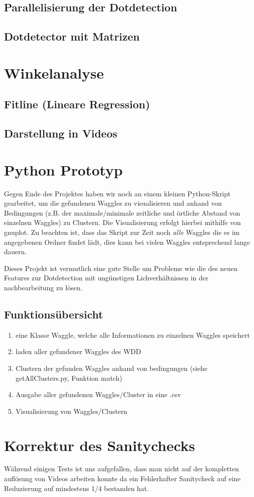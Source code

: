 \documentclass[11pt,a4paper]{article}
\begin{document}
\subsection{Parallelisierung der Dotdetection}%
\subsection{Dotdetector mit Matrizen}%

\section{Winkelanalyse}%

\subsection{Fitline (Lineare Regression)}%
\subsection{Darstellung in Videos}%


\section{Python Prototyp}%
Gegen Ende des Projektes haben wir noch an einem kleinen Python-Skript gearbeitet, um die gefundenen Waggles zu visualisieren und anhand von Bedingungen (z.B. der maximale/minimale zeitliche und örtliche Abstand von einzelnen Waggles) zu Clustern. Die Visualisierung erfolgt hierbei mithilfe von gnuplot. Zu beachten ist, dass das Skript zur Zeit noch \emph{alle} Waggles die es im angegebenen Ordner findet lädt, dies kann bei vielen Waggles entsprechend lange dauern.

Dieses Projekt ist vermutlich eine gute Stelle um Probleme wie die des neuen Features zur Dotdetection mit ungünstigen Lichverhältnissen in der nachbearbeitung zu lösen.
\subsection{Funktionsübersicht}%
\begin{enumerate}
\item eine Klasse Waggle, welche alle Informationen zu einzelnen Waggles speichert
\item laden aller gefundener Waggles des WDD
\item Clustern der gefunden Waggles anhand von bedingungen (siehe getAllClusters.py, Funktion match)
\item Ausgabe aller gefundenen Waggles/Cluster in eine .csv
\item Visualisierung von Waggles/Clustern\\
\end{enumerate}

\section{Korrektur des Sanitychecks}
Während einigen Tests ist uns aufgefallen, dass man nicht auf der kompletten auflösung von Videos arbeiten konnte da ein Fehlerhafter Sanitycheck auf eine Reduzierung auf mindestens 1/4 bestanden hat.
\end{document}
